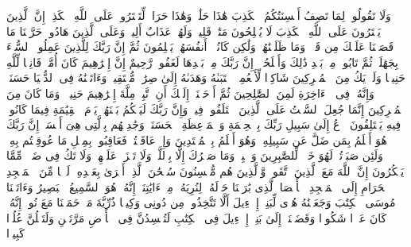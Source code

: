 \stopbuffer%
\startbuffer[\q:16:116]
وَلَا تَقُولُوا۟ لِمَا تَصِفُ أَلۡسِنَتُكُمُ ٱلۡكَذِبَ هَٰذَا حَلَٰلࣱ وَهَٰذَا حَرَامࣱ لِّتَفۡتَرُوا۟ عَلَى ٱللَّهِ ٱلۡكَذِبَۚ إِنَّ ٱلَّذِینَ یَفۡتَرُونَ عَلَى ٱللَّهِ ٱلۡكَذِبَ لَا یُفۡلِحُونَ%
\stopbuffer%
\startbuffer[\q:16:117]
مَتَٰعࣱ قَلِیلࣱ وَلَهُمۡ عَذَابٌ أَلِیمࣱ%
\stopbuffer%
\startbuffer[\q:16:118]
وَعَلَى ٱلَّذِینَ هَادُوا۟ حَرَّمۡنَا مَا قَصَصۡنَا عَلَیۡكَ مِن قَبۡلُۖ وَمَا ظَلَمۡنَٰهُمۡ وَلَٰكِن كَانُوۤا۟ أَنفُسَهُمۡ یَظۡلِمُونَ%
\stopbuffer%
\startbuffer[\q:16:119]
ثُمَّ إِنَّ رَبَّكَ لِلَّذِینَ عَمِلُوا۟ ٱلسُّوۤءَ بِجَهَٰلَةࣲ ثُمَّ تَابُوا۟ مِنۢ بَعۡدِ ذَٰلِكَ وَأَصۡلَحُوۤا۟ إِنَّ رَبَّكَ مِنۢ بَعۡدِهَا لَغَفُورࣱ رَّحِیمٌ%
\stopbuffer%
\startbuffer[\q:16:120]
إِنَّ إِبۡرَٰهِیمَ كَانَ أُمَّةࣰ قَانِتࣰا لِّلَّهِ حَنِیفࣰا وَلَمۡ یَكُ مِنَ ٱلۡمُشۡرِكِینَ%
\stopbuffer%
\startbuffer[\q:16:121]
شَاكِرࣰا لِّأَنۡعُمِهِۚ ٱجۡتَبَىٰهُ وَهَدَىٰهُ إِلَىٰ صِرَٰطࣲ مُّسۡتَقِیمࣲ%
\stopbuffer%
\startbuffer[\q:16:122]
وَءَاتَیۡنَٰهُ فِی ٱلدُّنۡیَا حَسَنَةࣰۖ وَإِنَّهُۥ فِی ٱلۡءَاخِرَةِ لَمِنَ ٱلصَّٰلِحِینَ%
\stopbuffer%
\startbuffer[\q:16:123]
ثُمَّ أَوۡحَیۡنَاۤ إِلَیۡكَ أَنِ ٱتَّبِعۡ مِلَّةَ إِبۡرَٰهِیمَ حَنِیفࣰاۖ وَمَا كَانَ مِنَ ٱلۡمُشۡرِكِینَ%
\stopbuffer%
\startbuffer[\q:16:124]
إِنَّمَا جُعِلَ ٱلسَّبۡتُ عَلَى ٱلَّذِینَ ٱخۡتَلَفُوا۟ فِیهِۚ وَإِنَّ رَبَّكَ لَیَحۡكُمُ بَیۡنَهُمۡ یَوۡمَ ٱلۡقِیَٰمَةِ فِیمَا كَانُوا۟ فِیهِ یَخۡتَلِفُونَ%
\stopbuffer%
\startbuffer[\q:16:125]
ٱدۡعُ إِلَىٰ سَبِیلِ رَبِّكَ بِٱلۡحِكۡمَةِ وَٱلۡمَوۡعِظَةِ ٱلۡحَسَنَةِۖ وَجَٰدِلۡهُم بِٱلَّتِی هِیَ أَحۡسَنُۚ إِنَّ رَبَّكَ هُوَ أَعۡلَمُ بِمَن ضَلَّ عَن سَبِیلِهِۦ وَهُوَ أَعۡلَمُ بِٱلۡمُهۡتَدِینَ%
\stopbuffer%
\startbuffer[\q:16:126]
وَإِنۡ عَاقَبۡتُمۡ فَعَاقِبُوا۟ بِمِثۡلِ مَا عُوقِبۡتُم بِهِۦۖ وَلَئِن صَبَرۡتُمۡ لَهُوَ خَیۡرࣱ لِّلصَّٰبِرِینَ%
\stopbuffer%
\startbuffer[\q:16:127]
وَٱصۡبِرۡ وَمَا صَبۡرُكَ إِلَّا بِٱللَّهِۚ وَلَا تَحۡزَنۡ عَلَیۡهِمۡ وَلَا تَكُ فِی ضَیۡقࣲ مِّمَّا یَمۡكُرُونَ%
\stopbuffer%
\startbuffer[\q:16:128]
إِنَّ ٱللَّهَ مَعَ ٱلَّذِینَ ٱتَّقَوا۟ وَّٱلَّذِینَ هُم مُّحۡسِنُونَ%
\stopbuffer%
\startbuffer[\q:17:1]
سُبۡحَٰنَ ٱلَّذِیۤ أَسۡرَىٰ بِعَبۡدِهِۦ لَیۡلࣰا مِّنَ ٱلۡمَسۡجِدِ ٱلۡحَرَامِ إِلَى ٱلۡمَسۡجِدِ ٱلۡأَقۡصَا ٱلَّذِی بَٰرَكۡنَا حَوۡلَهُۥ لِنُرِیَهُۥ مِنۡ ءَایَٰتِنَاۤۚ إِنَّهُۥ هُوَ ٱلسَّمِیعُ ٱلۡبَصِیرُ%
\stopbuffer%
\startbuffer[\q:17:2]
وَءَاتَیۡنَا مُوسَى ٱلۡكِتَٰبَ وَجَعَلۡنَٰهُ هُدࣰى لِّبَنِیۤ إِسۡرَٰۤءِیلَ أَلَّا تَتَّخِذُوا۟ مِن دُونِی وَكِیلࣰا%
\stopbuffer%
\startbuffer[\q:17:3]
ذُرِّیَّةَ مَنۡ حَمَلۡنَا مَعَ نُوحٍۚ إِنَّهُۥ كَانَ عَبۡدࣰا شَكُورࣰا%
\stopbuffer%
\startbuffer[\q:17:4]
وَقَضَیۡنَاۤ إِلَىٰ بَنِیۤ إِسۡرَٰۤءِیلَ فِی ٱلۡكِتَٰبِ لَتُفۡسِدُنَّ فِی ٱلۡأَرۡضِ مَرَّتَیۡنِ وَلَتَعۡلُنَّ عُلُوࣰّا كَبِیرࣰا%
